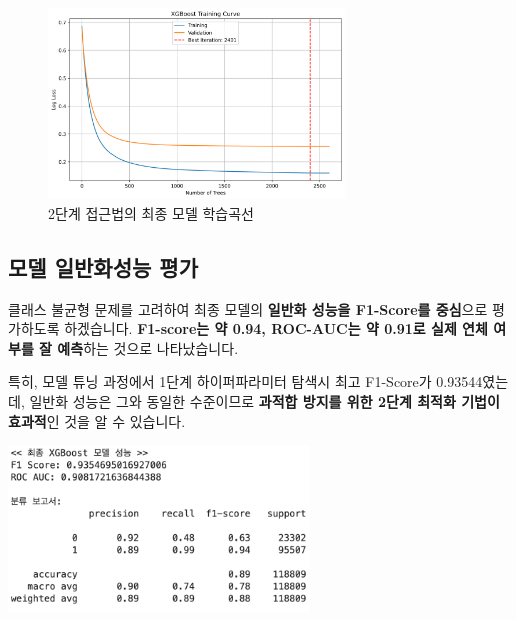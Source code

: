 \documentclass[
  a4paper,
  DIV=11,
  numbers=noendperiod]{scrreprt}
\begin{document}
\begin{figure}[H]

{\centering \includegraphics[width=0.7\textwidth,height=\textheight]{plots/learning_curve.png}

}

\caption{2단계 접근법의 최종 모델 학습곡선}

\end{figure}%

\subsection*{모델 일반화성능
평가}\label{uxbaa8uxb378-uxc77cuxbc18uxd654uxc131uxb2a5-uxd3c9uxac00}

클래스 불균형 문제를 고려하여 최종 모델의 \textbf{일반화 성능을
F1-Score를 중심}으로 평가하도록 하겠습니다. \textbf{F1-score는 약 0.94,
ROC-AUC는 약 0.91로 실제 연체 여부를 잘 예측}하는 것으로 나타났습니다.

특히, 모델 튜닝 과정에서 1단계 하이퍼파라미터 탐색시 최고 F1-Score가
0.93544였는데, 일반화 성능은 그와 동일한 수준이므로 \textbf{과적합
방지를 위한 2단계 최적화 기법이 효과적}인 것을 알 수 있습니다.

\includegraphics[width=0.6\textwidth,height=\textheight]{image/ml11_best.png}
\end{document}
